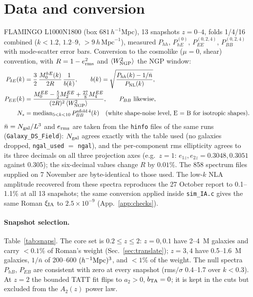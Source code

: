 \documentclass[11pt]{article}
\newcommand{\hmpc}{\,h\,\mathrm{Mpc}^{-1}}
\begin{document}
\section{Data and conversion}\label{sec:data}
FLAMINGO L1000N1800 (box $681\,h^{-1}$Mpc), 13 snapshots $z=0$--$4$, folds 1/4/16 combined ($k<1.2$, $1.2$--$9$, $>9\hmpc$), measured $P_{hh}$, $P_{hE}^{(0)}$, $P_{EE}^{(0,2,4)}$, $P_{BB}^{(0,2,4)}$ with mode-scatter error bars. Conversion to the cosmolike ($\mu=0$, shear) convention, with $R=1-e_{\rm rms}^2$ and $\langle W^2_{\rm NGP}\rangle$ the NGP window:
\begin{align}
P_{\delta E}(k) &= \frac{3}{2}\,\frac{M_0^{hE}(k)}{2R}\,\frac{1}{b(k)},\qquad b(k)=\sqrt{\frac{P_{hh}(k)-1/\bar n}{P_{\rm NL}(k)}},\\
P_{EE}(k) &= \frac{M_0^{EE}-\tfrac52 M_2^{EE}+\tfrac{27}{8}M_4^{EE}}{(2R)^2\,\langle W^2_{\rm NGP}\rangle},\qquad P_{BB}\ \text{likewise},\\
N_s &= \mathrm{median}_{5<k<10}\,P_{BB}^{\rm nfold\,4}(k)\quad\text{(white shape-noise level, E = B for isotropic shapes).}
\end{align}
$\bar n=N_{\rm gal}/L^3$ and $e_{\rm rms}$ are taken from the \texttt{hinfo} files of the same runs (\texttt{Galaxy\_DS\_Field}): $N_{\rm gal}$ agrees exactly with the table used (no galaxies dropped, \texttt{ngal\_used} $=$ \texttt{ngal}), and the per-component rms ellipticity agrees to its three decimals on all three projection axes (e.g.\ $z=1$: $e_{1z},e_{2z}=0.3048,0.3051$ against 0.305); the six-decimal values change $R$ by $0.01\%$. The 858 spectrum files supplied on 7 November are byte-identical to those used. The low-$k$ NLA amplitude recovered from these spectra reproduces the 27 October report to 0.1--1.1\% at all 13 snapshots; the same conversion applied inside \texttt{sim\_IA.c} gives the same Roman $\xi_{\rm IA}$ to $2.5\times10^{-9}$ (App.~\ref{app:checks}).

\paragraph{Snapshot selection.} Table~\ref{tab:snaps}. The core set is $0.2\le z\le2$: $z=0,0.1$ have 2--4~M galaxies and carry $<0.1\%$ of Roman's weight (Sec.~\ref{sec:translate}); $z=3,4$ have 0.5--1.6~M galaxies, $1/\bar n$ of 200--600 $(h^{-1}{\rm Mpc})^3$, and $<1\%$ of the weight. The null spectra $P_{hB}$, $P_{EB}$ are consistent with zero at every snapshot (rms$/\sigma$ 0.4--1.7 over $k<0.3$). At $z=2$ the bounded TATT fit flips to $a_2>0$, $b_{\rm TA}=0$; it is kept in the cuts but excluded from the $A_2(z)$ power law.
\end{document}
